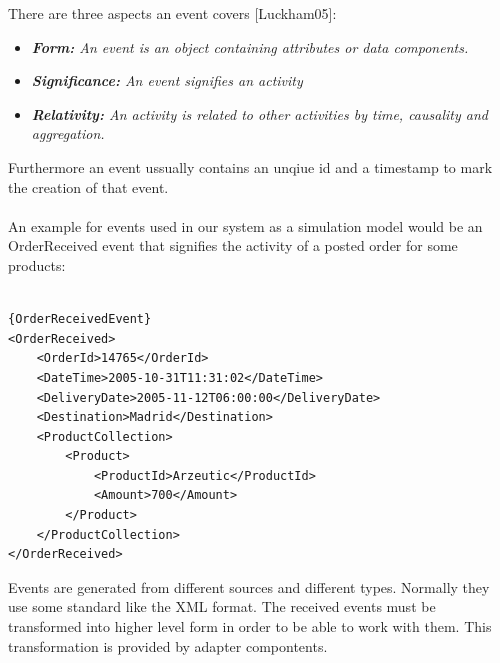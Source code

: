 \documentclass[a4paper,titlepage,11pt,DIV10,BCOR0.5cm,headinclude]{article}
\begin{document}
There are three aspects an event covers [Luckham05]:
\begin{itemize}
	\item \textit{\textbf{Form:} An event is an object containing attributes or data components.}
	\item \textit{\textbf{Significance:} An event signifies an activity}
	\item \textit{\textbf{Relativity:} An activity is related to other activities by time, causality and aggregation.}
\end{itemize}
Furthermore an event ussually contains an unqiue id and a timestamp to mark the creation of that event. 
\\\\
An example for events used in our system as a simulation model would be an OrderReceived event that signifies the activity of a posted order for some products:
\\\\
\begin{lstlisting}[caption=OrderReceivedEvent]{OrderReceivedEvent}
<OrderReceived>
	<OrderId>14765</OrderId>
	<DateTime>2005-10-31T11:31:02</DateTime>
	<DeliveryDate>2005-11-12T06:00:00</DeliveryDate>
	<Destination>Madrid</Destination>
	<ProductCollection>
		<Product>		
			<ProductId>Arzeutic</ProductId>
			<Amount>700</Amount>
		</Product>	
	</ProductCollection>
</OrderReceived>
\end{lstlisting}
Events are generated from different sources and different types. Normally they use some standard like the XML format. The received events must be transformed into higher level form in order to be able to work with them. This transformation is provided by adapter compontents.
\end{document}
